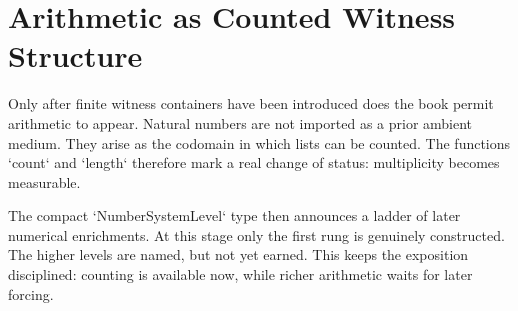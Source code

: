 \documentclass[11pt,a4paper]{book}
\begin{document}
\section{Arithmetic as Counted Witness Structure}

Only after finite witness containers have been introduced does the book permit arithmetic to appear. Natural numbers are not imported as a prior ambient medium. They arise as the codomain in which lists can be counted. The functions `count` and `length` therefore mark a real change of status: multiplicity becomes measurable.

The compact `NumberSystemLevel` type then announces a ladder of later numerical enrichments. At this stage only the first rung is genuinely constructed. The higher levels are named, but not yet earned. This keeps the exposition disciplined: counting is available now, while richer arithmetic waits for later forcing.

\begin{center}
\end{center}
\end{document}
